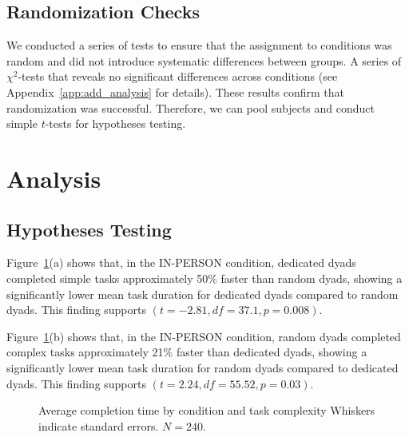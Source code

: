 \documentclass[msom,nonblindrev]{01 latex/class/informs3}
\begin{document}
\subsection{Randomization Checks}
We conducted a series of tests to ensure that the assignment to conditions was random and did not introduce systematic differences between groups. A series of $\chi^2$-tests that reveals no significant differences across conditions (see Appendix~\ref{app:add_analysis} for details). These results confirm that randomization was successful. Therefore, we can pool subjects and conduct simple $t$-tests for hypotheses testing. 


\section{Analysis}

\subsection{Hypotheses Testing}

Figure~\ref{fig:treatment.comparison}(a) shows that, in the IN-PERSON condition, dedicated dyads completed simple tasks approximately 50\% faster than random dyads, showing a significantly lower mean task duration for dedicated dyads compared to random dyads. This finding supports  $(t=-2.81, df=37.1, p=0.008)$.

Figure~\ref{fig:treatment.comparison}(b) shows that, in the IN-PERSON condition, random dyads completed complex tasks approximately 21\% faster than dedicated dyads, showing a significantly lower mean task duration for random dyads compared to dedicated dyads. This finding supports  $(t=2.24, df=55.52, p=0.03)$.


\begin{figure}[htbp]
{Average completion time by condition and task complexity\label{fig:treatment.comparison}}
{Whiskers indicate standard errors. $N = 240.$}
\end{figure}
\end{document}
